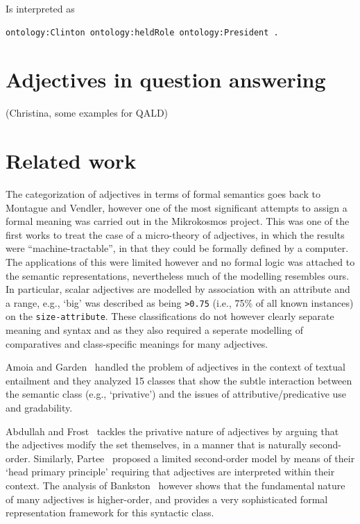 \documentclass[11pt]{article}
\begin{document}
Is interpreted as

\begin{verbatim}
ontology:Clinton ontology:heldRole ontology:President .
\end{verbatim}

\section{Adjectives in question answering}

(Christina, some examples for QALD)

\section{Related work}

The categorization of adjectives in terms of formal semantics goes back to Montague and Vendler, however one of the most significant attempts to assign a formal meaning was carried out in the Mikrokosmos project\cite{raskin1995lexical}. This was one of the first works to treat the case of a micro-theory of adjectives, in which the results were ``machine-tractable'', in that they could be formally defined by a computer. The applications of this were limited however and no formal logic was attached to the semantic representations, nevertheless much of the modelling resembles ours. In particular, scalar adjectives are modelled by association with an attribute and a range, e.g., `big' was described as being {\tt >0.75} (i.e., 75\% of all known instances) on the {\tt size-attribute}. These classifications do not however clearly separate meaning and syntax and as they also required a seperate modelling of comparatives and class-specific meanings for many adjectives.

Amoia and Garden~ handled the problem of adjectives in the context of textual entailment and they analyzed 15 classes that show the subtle interaction between the semantic class (e.g., `privative') and the issues of attributive/predicative use and gradability. 

Abdullah and Frost~ tackles the privative nature of adjectives by arguing that the adjectives modify the set themselves, in a manner that is naturally second-order. Similarly, Partee~ proposed a limited second-order model by means of their `head primary principle' requiring that adjectives are interpreted within their context. The analysis of Bankston~ however shows that the fundamental nature of many adjectives is higher-order, and provides a very sophisticated formal representation framework for this syntactic class.
\end{document}
